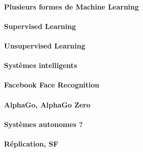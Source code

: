 \paragraph{Plusieurs formes de Machine Learning}

\paragraph{}

\paragraph{Supervised Learning}

\paragraph{Unsupervised Learning}

\paragraph{Systèmes intelligents}

\paragraph{}

\paragraph{Facebook Face Recognition}

\paragraph{AlphaGo, AlphaGo Zero}

\paragraph{}

\paragraph{Systèmes autonomes ?}

\paragraph{Réplication, SF}
